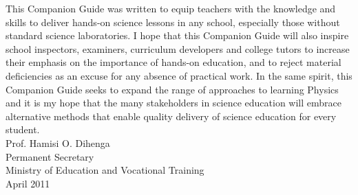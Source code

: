 This Companion Guide was written to equip teachers with the knowledge and skills to deliver hands-on science lessons in any school, especially those without standard science laboratories. I hope that this Companion Guide will also inspire school inspectors, examiners, curriculum developers and college tutors to increase their emphasis on the importance of hands-on education, and to reject material deficiencies as an excuse for any absence of practical work. In the same spirit, this Companion Guide seeks to expand the range of approaches to learning Physics and it is my hope that the many stakeholders in science education will embrace alternative methods that enable quality delivery of science education for every student.\\[80pt]
Prof. Hamisi O. Dihenga\\
Permanent Secretary\\
Ministry of Education and Vocational Training\\
April 2011
